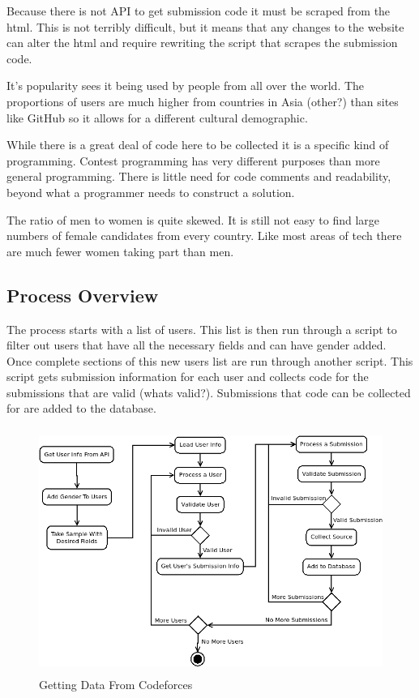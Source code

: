 \documentclass{article}
\begin{document}
Because there is not API to get submission code it must be scraped from the html. This is not terribly difficult, but it means that any changes to the website can alter the html and require rewriting the script that scrapes the submission code.

It's popularity sees it being used by people from all over the world. The proportions of users are much higher from countries in Asia (other?) than sites like GitHub so it allows for a different cultural demographic.

While there is a great deal of code here to be collected it is a specific kind of programming. Contest programming has very different purposes than more general programming. There is little need for code comments and readability, beyond what a programmer needs to construct a solution.

The ratio of men to women is quite skewed. It is still not easy to find large numbers of female candidates from every country. Like most areas of tech there are much fewer women taking part than men.

\subsection{Process Overview}
The process starts with a list of users. This list is then run through a script to filter out users that have all the necessary fields and can have gender added. Once complete sections of this new users list are run through another script. This script gets submission information for each user and collects code for the submissions that are valid (whats valid?). Submissions that code can be collected for are added to the database.

\begin{figure}[!h]
    \centering
    \includegraphics[height=8cm]{diagrams/cf_process.png}
    \caption{Getting Data From Codeforces}
\end{figure}
\end{document}
